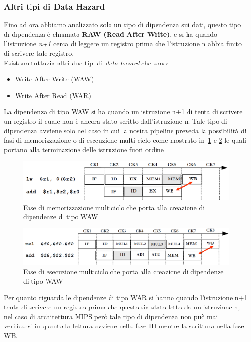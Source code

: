 \subsubsection{Altri tipi di Data Hazard}
Fino ad ora abbiamo analizzato solo un tipo di dipendenza sui dati, questo tipo di dipendenza è chiamato \textbf{RAW (Read After Write)}, e si ha quando l'istruzione \emph{n+1} cerca di leggere un registro prima che l'istruzione n abbia finito di scrivere tale registro.\\
Esistono tuttavia altri due tipi di \emph{data hazard} che sono:
\begin{itemize}
\item Write After Write (WAW)
\item Write After Read (WAR)
\end{itemize}
La dipendenza di tipo WAW si ha quando un istruzione n+1 di tenta di scrivere un registro il quale non è ancora stato scritto dall'istruzione n. Tale tipo di dipendenza avviene solo nel caso in cui la nostra pipeline preveda la possibilità di fasi di memorizzazione o di esecuzione multi-ciclo come mostrato in \figurename\,\ref{fig:multimem} e \ref{fig:multiexe} le quali portano alla terminazione delle istruzione fuori ordine
\begin{figure}
\centering
\includegraphics[scale=0.4]{img/multimem.png}
\caption{Fase di memorizzazione multiciclo che porta alla creazione di dipendenze di tipo WAW}\label{fig:multimem}
\end{figure}
\begin{figure}
\centering
\includegraphics[scale=0.4]{img/multiexe.png}
\caption{Fase di esecuzione multiciclo che porta alla creazione di dipendenze di tipo WAW}\label{fig:multiexe}
\end{figure}
Per quanto riguarda le dipendenze di tipo WAR si hanno quando l'istruzione n+1 tenta di scrivere un registro prima che questo sia stato letto da un istruzione n, nel caso di architettura MIPS però tale tipo di dipendenza non può mai verificarsi in quanto la lettura avviene nella fase ID mentre la scrittura nella fase WB.
